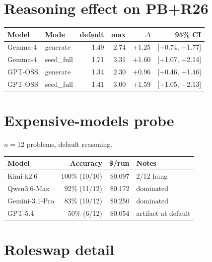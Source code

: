 \documentclass{article}
\begin{document}
\section{Reasoning effect on PB+R26}
\label{app:reasoning}

\begin{table}[h]
  \centering
  \small
  \begin{tabular}{llrrrr}
    \toprule
    Model & Mode & default & max & $\Delta$ & 95\% CI \\
    \midrule
    Gemma-4 & generate & 1.49 & 2.74 & +1.25 & [+0.74, +1.77] \\
    Gemma-4 & seed\_full & 1.71 & 3.31 & +1.60 & [+1.07, +2.14] \\
    GPT-OSS & generate & 1.34 & 2.30 & +0.96 & [+0.46, +1.46] \\
    GPT-OSS & seed\_full & 1.41 & 3.00 & +1.59 & [+1.05, +2.13] \\
    \bottomrule
  \end{tabular}
\end{table}

\section{Expensive-models probe}
\label{app:expensive}

$n{=}12$ problems, default reasoning.

\begin{table}[h]
  \centering
  \small
  \begin{tabular}{lrrl}
    \toprule
    Model & Accuracy & \$/run & Notes \\
    \midrule
    Kimi-k2.6 & 100\% (10/10) & \$0.097 & 2/12 hung \\
    Qwen3.6-Max & 92\% (11/12) & \$0.172 & dominated \\
    Gemini-3.1-Pro & 83\% (10/12) & \$0.250 & dominated \\
    GPT-5.4 & 50\% (6/12) & \$0.054 & artifact at default \\
    \bottomrule
  \end{tabular}
\end{table}

\section{Roleswap detail}
\label{app:roleswap}
\end{document}
